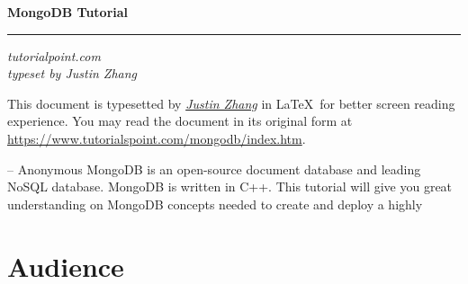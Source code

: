 \documentclass[12pt]{article}
\newcommand{\mytitle}[1]{
  {\HUGE \bfseries #1}\par
}
\newcommand{\mysubtitle}[1]{
  {\emph{#1}}\par
}
\begin{document}
\begin{titlepage}
\begin{minipage}{0.8\linewidth}
  \vspace*{4cm}
  \begin{center}
    \noindent
    \mytitle{MongoDB Tutorial}
    \rule{\linewidth}{0.2ex}\par
    \mysubtitle{tutorialpoint.com \\ typeset by Justin Zhang}
  \end{center}
\end{minipage}
\null \vfill
\hfill
\begin{minipage}{0.55\linewidth}
  \begin{flushright}
  \end{flushright}
\end{minipage}
%
\titlepagedecoration
\end{titlepage}

\newpage
\tableofcontents

\newpage
\thispagestyle{empty}
\vspace*{\fill}
This document is typesetted by \href{mailto:schnell18@gmail.com}{\emph{Justin
Zhang}} in \LaTeX\ for better screen reading experience. You
may read the document in its original form at\\
\href{https://www.tutorialspoint.com/mongodb/index.htm}{https://www.tutorialspoint.com/mongodb/index.htm}.
\vspace*{\fill}

\newpage
\thispagestyle{empty}
\vspace*{\fill}
\begin{shadequote}[r]{-- Anonymous}
MongoDB is an open-source document database and leading NoSQL database.
MongoDB is written in C++. This tutorial will give you great
understanding on MongoDB concepts needed to create and deploy a highly
\end{shadequote}

\vspace*{\fill}

\newpage
\section{Audience}
\end{document}
